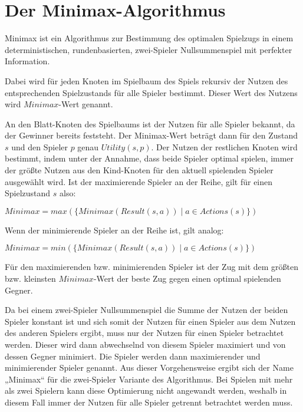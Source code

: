 \section{Der Minimax-Algorithmus}
\label{sec:minimax}

Minimax ist ein Algorithmus zur Bestimmung des optimalen Spielzugs in einem deterministischen, rundenbasierten,
zwei-Spieler Nullsummenspiel mit perfekter Information.

Dabei wird für jeden Knoten im Spielbaum des Spiels rekursiv der Nutzen des entsprechenden Spielzustands für alle
Spieler bestimmt. Dieser Wert des Nutzens wird $Minimax$-Wert genannt.

An den Blatt-Knoten des Spielbaums ist der Nutzen für alle Spieler bekannt, da der Gewinner bereits feststeht. Der
Minimax-Wert beträgt dann für den Zustand $s$ und den Spieler $p$ genau $Utility(s, p)$. Der Nutzen der restlichen Knoten
wird bestimmt, indem unter der Annahme, dass beide Spieler optimal spielen, immer der größte Nutzen aus den Kind-Knoten
für den aktuell spielenden Spieler ausgewählt wird. Ist der maximierende Spieler an der Reihe, gilt für einen
Spielzustand $s$ also:

\hspace*{1.3cm}
$Minimax=max(\{Minimax(Result(s, a)) \mid a \in Actions(s)\})$

Wenn der minimierende Spieler an der Reihe ist, gilt analog:

\hspace*{1.3cm}
$Minimax=min(\{Minimax(Result(s, a)) \mid a \in Actions(s)\})$

Für den maximierenden bzw. minimierenden Spieler ist der Zug mit dem größten bzw. kleinsten $Minimax$-Wert der beste Zug
gegen einen optimal spielenden Gegner.
\cite[S.~164f.]{ai2010russel}

Da bei einem zwei-Spieler Nullsummenspiel die Summe der Nutzen der beiden Spieler konstant ist und sich somit der
Nutzen für einen Spieler aus dem Nutzen des anderen Spielers ergibt, muss nur der Nutzen für einen Spieler betrachtet
werden. Dieser wird dann abwechselnd von diesem Spieler maximiert und von dessen Gegner minimiert. Die Spieler werden
dann maximierender und minimierender Spieler genannt. Aus dieser Vorgehensweise ergibt sich der Name „Minimax“
für die zwei-Spieler Variante des Algorithmus. Bei Spielen mit mehr als zwei Spielern kann diese Optimierung nicht
angewandt werden, weshalb in diesem Fall immer der Nutzen für alle Spieler getrennt betrachtet werden muss.
\cite[S.~165]{ai2010russel}





